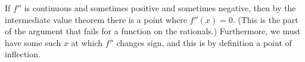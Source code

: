 If $f''$ is continuous and sometimes positive and sometimes negative,
then by the intermediate value theorem there is a point where $f''(x)=0$.
(This is the part of the argument that fails for a function on the rationals.)
Furthermore, we must have some such $x$ at which $f''$ changes sign,
and this is by definition a point of inflection.

